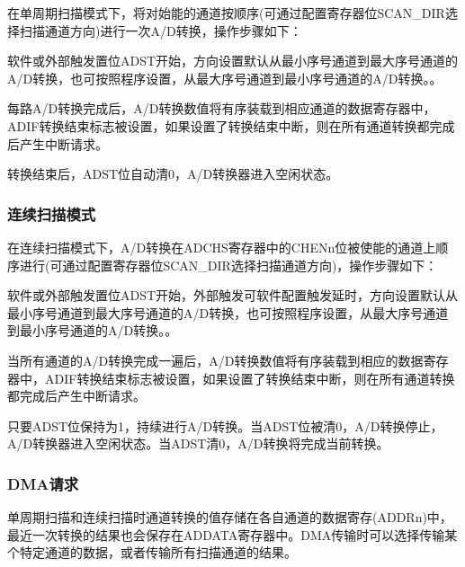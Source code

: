 在单周期扫描模式下，将对始能的通道按顺序(可通过配置寄存器位SCAN\_DIR选择扫描通道方向)进行一次A/D转换，操作步骤如下：\par

软件或外部触发置位ADST开始，方向设置默认从最小序号通道到最大序号通道的A/D转换，也可按照程序设置，从最大序号通道到最小序号通道的A/D转换。。\par 


每路A/D转换完成后，A/D转换数值将有序装载到相应通道的数据寄存器中，ADIF转换结束标志被设置，如果设置了转换结束中断，则在所有通道转换都完成后产生中断请求。\par 

转换结束后，ADST位自动清0，A/D转换器进入空闲状态。\par 


\subsubsection{连续扫描模式}


在连续扫描模式下，A/D转换在ADCHS寄存器中的CHENn位被使能的通道上顺序进行(可通过配置寄存器位SCAN\_DIR选择扫描通道方向)，操作步骤如下：\par 

软件或外部触发置位ADST开始，外部触发可软件配置触发延时，方向设置默认从最小序号通道到最大序号通道的A/D转换，也可按照程序设置，从最大序号通道到最小序号通道的A/D转换。。


当所有通道的A/D转换完成一遍后，A/D转换数值将有序装载到相应的数据寄存器中，ADIF转换结束标志被设置，如果设置了转换结束中断，则在所有通道转换都完成后产生中断请求。\par  

只要ADST位保持为1，持续进行A/D转换。当ADST位被清0，A/D转换停止，A/D转换器进入空闲状态。当ADST清0，A/D转换将完成当前转换。\par


\subsubsection{DMA请求}

单周期扫描和连续扫描时通道转换的值存储在各自通道的数据寄存(ADDRn)中，最近一次转换的结果也会保存在ADDATA寄存器中。DMA传输时可以选择传输某个特定通道的数据，或者传输所有扫描通道的结果。\par 

